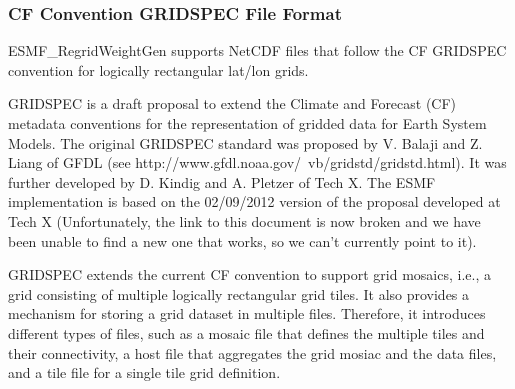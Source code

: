 \subsubsection{CF Convention GRIDSPEC File Format}\label{sec:fileformat:gridspec}

ESMF\_RegridWeightGen supports NetCDF files that follow the CF GRIDSPEC convention for logically rectangular lat/lon grids.

GRIDSPEC is a draft proposal to extend the Climate and Forecast (CF) metadata conventions for the representation of gridded data for Earth System Models.  The original GRIDSPEC standard was proposed by V. Balaji and Z. Liang of GFDL (see  {http://www.gfdl.noaa.gov/~vb/gridstd/gridstd.html}).  It was further developed by D. Kindig and A. Pletzer of Tech X.  The ESMF implementation is based on the 02/09/2012 version of the proposal developed at Tech X (Unfortunately, the link to this document is now broken and we have been unable to find a new one that works, so we can't currently point to it). 

GRIDSPEC extends the current CF convention to support grid  mosaics, i.e., a grid consisting of multiple logically
rectangular grid tiles. It also provides a mechanism for storing a grid dataset in multiple files.  Therefore,
it introduces different types of files, such as a mosaic file that defines the multiple tiles and their
connectivity, a host file that aggregates the grid mosiac and the data files, and a tile file for a single tile
grid definition.

